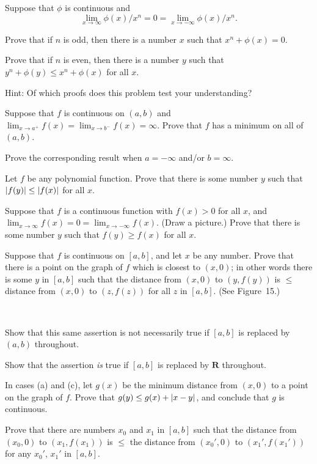  Suppose that $\phi$ is continuous and
\[
\lim_{x\to\infty}\phi(x)/x^n=0=\lim_{x\to-\infty}\phi(x)/x^n.
\]
\begin{letters}
\item Prove that if $n$ is odd, then there is a number $x$ such that
$x^n+\phi(x)=0$.
\item Prove that if $n$ is even, then there is a number $y$ such that
$y^n+\phi(y)\leq x^n+\phi(x)$ for all $x$.
\end{letters}
Hint: Of which proofs does this problem test your understanding?

\begin{letters}
\item Suppose that $f$ is continuous on $(a,b)$ and
$\lim_{x\to a^+}f(x)=\lim_{x\to b^-}f(x)=\infty$. Prove that $f$ has a minimum
on all of $(a,b)$.
\item Prove the corresponding result when $a=-\infty$ and/or $b=\infty$.
\end{letters}

 Let $f$ be any polynomial function. Prove that there is some number
$y$ such that $\lvert f(y)\rvert\leq\lvert f(x)\rvert$ for all $x$.

 Suppose that $f$ is a continuous function with $f(x)>0$ for all
$x$, and $\lim_{x\to\infty}f(x)=0=\lim_{x\to-\infty}f(x)$. (Draw a picture.)
Prove that there is some number $y$ such that $f(y)\geq f(x)$ for all $x$.

\begin{letters}
\item Suppose that $f$ is continuous on $[a,b]$, and let $x$ be any number.
Prove that there is a point on the graph of $f$ which is closest to $(x,0)$; in
other words there is some $y$ in $[a,b]$ such that the distance from $(x,0)$ to
$(y,f(y))$ is $\leq$ distance from $(x,0)$ to $(z,f(z))$ for all $z$ in
$[a,b]$. (See Figure~15.)
\begin{center}
\\[0.6em]
\end{center}
\item Show that this same assertion is not necessarily true if $[a,b]$ is
replaced by $(a,b)$ throughout.
\item Show that the assertion \emph{is} true if $[a,b]$ is replaced by
$\mathbf{R}$ throughout.
\item In cases (a) and (c), let $g(x)$ be the minimum distance from $(x,0)$ to
a point on the graph of $f$. Prove that $g(y)\leq g(x)+\lvert x-y\rvert$, and conclude
that $g$ is continuous.
\item Prove that there are numbers $x_0$ and $x_1$ in $[a,b]$ such that the
distance from $(x_0,0)$ to $(x_1,f(x_1))$ is $\leq$ the distance from
$(x_0',0)$ to $(x_1',f(x_1'))$ for any $x_0'$, $x_1'$ in $[a,b]$.
\end{letters}

